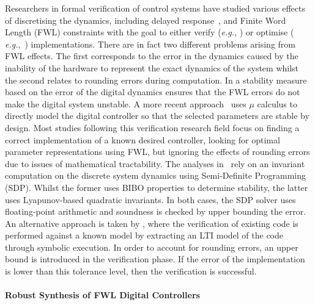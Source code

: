 \documentclass{sig-alternate-05-2015}
\begin{document}
Researchers in formal verification of control systems have studied various
effects of discretising the dynamics, including delayed
response~\cite{Duggirala2015}, and Finite Word Length (FWL) constraints with
the goal to either verify ({\it e.g.}, \cite{daes20161}) or optimise ({\it
e.g.},~\cite{oudjida2014design}) implementations.  There are in fact two
different problems arising from FWL effects.  The first corresponds to the
error in the dynamics caused by the inability of the hardware to represent
the exact dynamics of the system whilst the second relates to rounding
errors during computation.  In \cite{fialho1994stability} a stability
measure based on the error of the digital dynamics ensures that the FWL
errors do not make the digital system unstable.  A more recent
approach~\cite{DBLP:journals/automatica/WuLCC09} uses $\mu$ calculus to
directly model the digital controller so that the selected parameters are
stable by design.  Most studies following this verification research field
focus on finding a correct implementation of a known desired controller,
looking for optimal parameter representations using FWL, but ignoring the
effects of rounding errors due to issues of mathematical tractability.  The
analyses in~\cite{DBLP:conf/hybrid/WangGRJF16,DBLP:conf/hybrid/RouxJG15}
rely on an invariant computation on the discrete system dynamics using
Semi-Definite Programming (SDP).  Whilst the former uses BIBO properties to
determine stability, the latter uses Lyapunov-based quadratic invariants. 
In both cases, the SDP solver uses floating-point arithmetic and soundness
is checked by upper bounding the error.  An alternative approach is taken by
\cite{park2016scalable}, where the verification of existing code is
performed against a known model by extracting an LTI model of the code
through symbolic execution.  In order to account for rounding errors, an
upper bound is introduced in the verification phase.  If the error of the
implementation is lower than this tolerance level, then the verification is
successful.

\paragraph{Robust Synthesis of FWL Digital Controllers}
\end{document}
